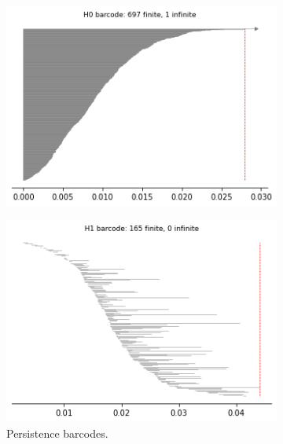 \begin{figure}[H]
\begin{subfigure}[b]{0.25\textwidth}
\end{subfigure}
\begin{subfigure}[b]{0.24\textwidth}
    \includegraphics[width=\textwidth]{figures/X2_H0_barcode.png}
    \caption{}
\end{subfigure}
\begin{subfigure}[b]{0.24\textwidth}
    \includegraphics[width=\textwidth]{figures/X2_H1_barcode.png}
        \caption{Persistence barcodes.}
\end{subfigure}
\begin{subfigure}[b]{0.24\textwidth}

\end{subfigure}
\end{figure}
